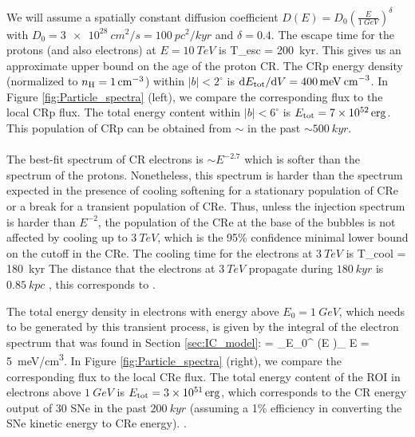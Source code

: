 We will assume a spatially constant diffusion coefficient $D(E) = D_0\left(\frac{E}{\SI{1}{GeV}}\right)^\delta$ with $D_0 = \SI{3e28}{cm^2/s} = \SI{100}{pc^2/kyr}$ and $\delta = 0.4$.
The escape time for the protons (and also electrons) at $E = \SI{10}{TeV}$ is 
\be
T_{\rm esc} =  \approx \SI{200}{kyr}.
\ee
{}
This gives us an approximate upper bound on the age of the proton CR.
The CRp energy density (normalized to $n_{\text{H}} = \SI{1}{cm^{-3}}$) within $|b| < 2^\circ$ is 
$\text{d} E_{\text{tot}} / \text{d} V = \SI{400}{meV\: cm^{-3}}$.
In Figure \ref{fig:Particle_spectra} (left), we compare the corresponding flux to the local CRp flux.
The total energy content within $|b| < 6^\circ$ is $E_{\text{tot}} = \SI{7e52}{erg}$.
This population of CRp can be obtained from $\sim$  in the past $\sim \SI{500}{kyr}$. \\
\\


The best-fit spectrum of CR electrons is $\sim E^{-2.7}$ which is softer than the spectrum of the protons.
Nonetheless, this spectrum is harder than the spectrum expected in the presence of cooling softening
for a stationary population of CRe or a break for a transient population of CRe.
Thus, unless the injection spectrum is harder than $E^{-2}$, the population of the CRe at the base of the 
bubbles is not affected by cooling up to $\SI{3}{TeV}$,
which is the 95\% confidence minimal lower bound on the cutoff in the CRe. 
The cooling time for the electrons at $\SI{3}{TeV}$ is
\be
T_{\rm cool} = \SI{180}{kyr}
\ee
{} The distance that the electrons at $\SI{3}{TeV}$ propagate during $\SI{180}{kyr}$ is $\SI{0.85}{kpc}$ , this corresponds to .

The total energy density in electrons with energy above $E_0 = \SI{1}{GeV}$, which needs to be generated by this transient process, is given by the integral of the electron spectrum that was found in Section \ref{sec:IC_model}:
\be
{} = \int_{E_0}^{\infty} \left(E \right)_{\!\!\el} \de E = \SI{5}{meV/cm^3}.
\ee
In Figure \ref{fig:Particle_spectra} (right), we compare the corresponding flux to the local CRe flux.
The total energy content of the ROI in electrons above $\SI{1}{GeV}$ is $E_{\text{tot}} = \SI{3e51}{erg}$, which corresponds to the CR energy output of 30 SNe in the past $\SI{200}{kyr}$ (assuming a 1\% efficiency in converting the SNe kinetic energy to CRe energy). 
. 

